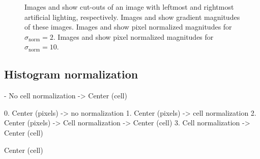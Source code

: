\documentclass[thesis.tex]{subfiles}
\begin{document}
\begin{figure}[tb]
\begin{subfigure}[t]{0.49\textwidth}
        \caption{}
        \label{fig:pixelNormalizationExample8}
    \end{subfigure}
    \caption{Images  and  show cut-outs of an image with leftmost and rightmost artificial lighting, respectively. Images  and  show gradient magnitudes of these images. Images  and  show pixel normalized magnitudes for $\sigma_\text{norm} = 2$. Images  and  show pixel normalized magnitudes for $\sigma_\text{norm} = 10$.}
    \label{fig:pixelNormalizationExample}
\end{figure}
%
\subsection{Histogram normalization}

- No cell normalization -> Center (cell)

0. Center (pixels) -> no normalization
1. Center (pixels) -> cell normalization
2. Center (pixels) -> Cell normalization -> Center (cell)
3. Cell normalization -> Center (cell)

Center (cell)


\subbibliography
\end{document}
